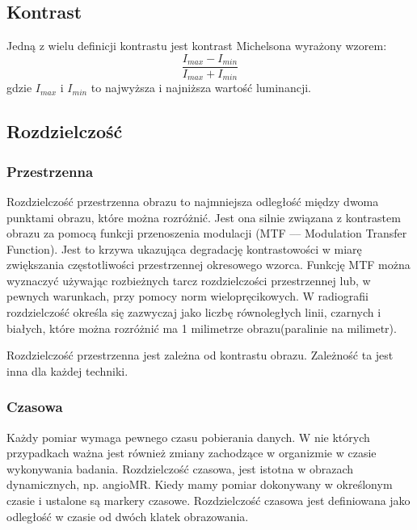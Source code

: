 


\subsection{Kontrast}

Jedną z wielu definicji kontrastu jest kontrast Michelsona wyrażony wzorem:
\[\frac{I_{max}-I_{min}}{I_{max}+I_{min}}\]
gdzie $I_{max}$ i $I_{min}$ to najwyższa i najniższa wartość luminancji.

\subsection{Rozdzielczość}

\subsubsection*{Przestrzenna}

\par
Rozdzielczość przestrzenna obrazu to najmniejsza odległość między dwoma punktami obrazu, które można rozróżnić.
Jest ona silnie związana z kontrastem obrazu za pomocą funkcji przenoszenia modulacji (MTF –-- Modulation Transfer Function).
Jest to krzywa ukazująca degradację kontrastowości w miarę zwiększania częstotliwości przestrzennej okresowego wzorca.
Funkcję MTF można wyznaczyć używając rozbieżnych tarcz rozdzielczości przestrzennej lub, w pewnych warunkach, przy pomocy norm wielopręcikowych.
W radiografii rozdzielczość określa się zazwyczaj jako liczbę równoległych linii, czarnych i białych, które można rozróżnić ma 1 milimetrze obrazu(paralinie na milimetr).

\par
Rozdzielczość przestrzenna jest zależna od kontrastu obrazu.
Zależność ta jest inna dla każdej techniki.

\subsubsection*{Czasowa}

Każdy pomiar wymaga pewnego czasu pobierania danych.
W nie których przypadkach ważna jest również zmiany zachodzące w organizmie w czasie wykonywania badania.
Rozdzielczość czasowa, jest istotna w obrazach dynamicznych, np. angioMR.
Kiedy mamy pomiar dokonywany w określonym czasie i ustalone są markery czasowe.
Rozdzielczość czasowa jest definiowana jako odległość w czasie od dwóch klatek obrazowania.

